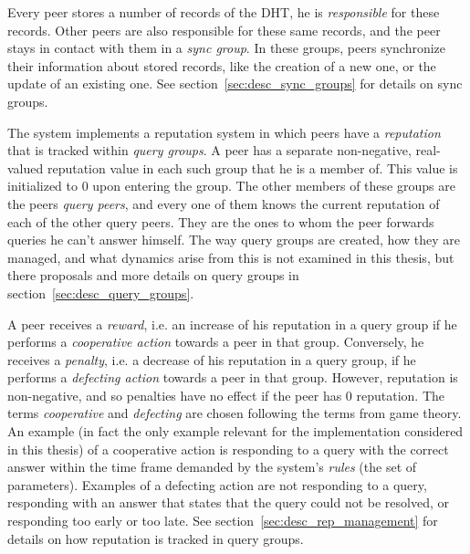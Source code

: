 Every peer stores a number of records of the \ac{DHT}, he is \emph{responsible}
for these records. Other peers are also responsible for these same records, and
the peer stays in contact with them in a \emph{sync group}. In these groups,
peers synchronize their information about stored records, like the creation of a
new one, or the update of an existing one. See
section~\ref{sec:desc_sync_groups} for details on sync groups.

The system implements a reputation system in which peers have a
\emph{reputation} that is tracked within \emph{query groups}. A peer has a
separate non-negative, real-valued reputation value in each such group that he
is a member of. This value is initialized to 0 upon entering the group. The
other members of these groups are the peers \emph{query peers}, and every one of
them knows the current reputation of each of the other query peers. They are the
ones to whom the peer forwards queries he can't answer himself. The way query
groups are created, how they are managed, and what dynamics arise from this is
not examined in this thesis, but there proposals and more details on query
groups in section~\ref{sec:desc_query_groups}.

A peer receives a \emph{reward}, i.e. an increase of his reputation in a query
group if he performs a \emph{cooperative action} towards a peer in that group.
Conversely, he receives a \emph{penalty}, i.e. a decrease of his reputation in a
query group, if he performs a \emph{defecting action} towards a peer in that
group. However, reputation is non-negative, and so penalties have no effect if
the peer has 0 reputation. The terms \emph{cooperative} and \emph{defecting} are
chosen following the terms from game theory. An example (in fact the only
example relevant for the implementation considered in this thesis) of a
cooperative action is responding to a query with the correct answer within the
time frame demanded by the system's \emph{rules} (the set of parameters).
Examples of a defecting action are not responding to a query, responding with an
answer that states that the query could not be resolved, or responding too early
or too late. See section~\ref{sec:desc_rep_management} for details on how
reputation is tracked in query groups.

